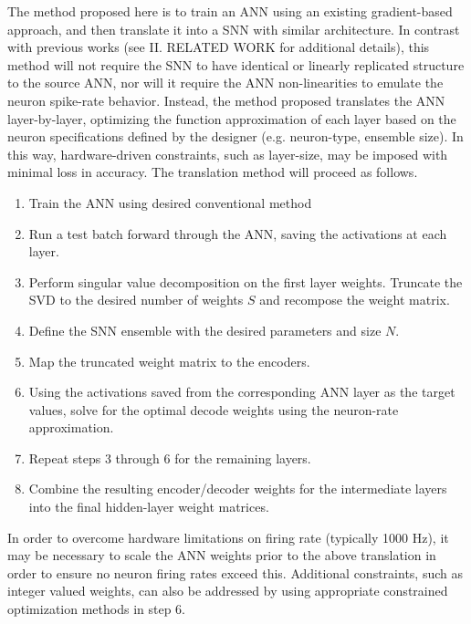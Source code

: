 \documentclass[letterpaper, 10 pt, conference]{ieeeconf}  %
\begin{document}
The method proposed here is to train an ANN using an existing gradient-based approach, and then translate it into a SNN with similar architecture. In contrast with previous works (see II. RELATED WORK for additional details), this method will not require the SNN to have identical or linearly replicated structure to the source ANN, nor will it require the ANN non-linearities to emulate the neuron spike-rate behavior. Instead, the method proposed translates the ANN layer-by-layer, optimizing the function approximation of each layer based on the neuron specifications defined by the designer (e.g. neuron-type, ensemble size). In this way, hardware-driven constraints, such as layer-size, may be imposed with minimal loss in accuracy. The translation method will proceed as follows. 

\begin{enumerate}
\item Train the ANN using desired conventional method
\item Run a test batch forward through the ANN, saving the activations at each layer.
\item Perform singular value decomposition on the first layer weights. Truncate the SVD to the desired number of weights $S$ and recompose the weight matrix.
\item Define the SNN ensemble with the desired parameters and size $N$. 
\item Map the truncated weight matrix to the encoders.
\item Using the activations saved from the corresponding ANN layer as the target values, solve for the optimal decode weights using the neuron-rate approximation. 
\item Repeat steps 3 through 6 for the remaining layers. 
\item Combine the resulting encoder/decoder weights for the intermediate layers into the final hidden-layer weight matrices. 
\end{enumerate}

In order to overcome hardware limitations on firing rate (typically 1000 Hz), it may be necessary to scale the ANN weights prior to the above translation in order to ensure no neuron firing rates exceed this. Additional constraints, such as integer valued weights, can also be addressed by using appropriate constrained optimization methods in step 6. 
\end{document}
